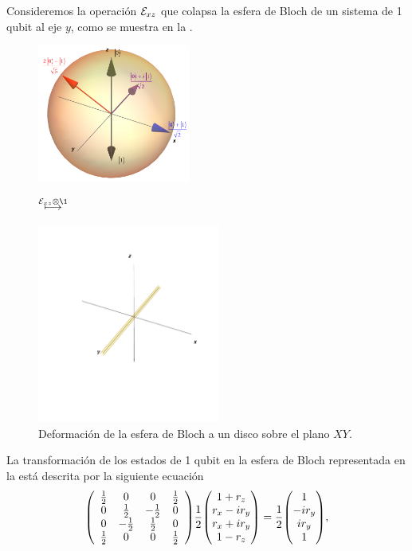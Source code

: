 Consideremos la operación $\mathcal{E}_{xz}$ que colapsa la esfera de Bloch de 
un sistema de 1 qubit al eje $y$, como se muestra en la .
\begin{figure}[H]
    \centering
    \begin{minipage}{.4\textwidth}
        \centering
        \includegraphics[width=5cm]
        {img-congreso/bloch.png}
    \end{minipage}
    $\stackrel{\E_{xz}\otimes\1 \vspace{1cm}}{\longmapsto}$
    \begin{minipage}{0.4\textwidth}
        \centering
        \includegraphics[width=6cm]
        {img-congreso/lineY}
    \end{minipage}
    \caption{Deformación de la esfera de Bloch a un disco sobre el plano $XY$.}
    \label{fig:QC-ex2}
\end{figure}
La transformación de los estados de 1 qubit en la esfera de Bloch 
representada en la  está descrita por la siguiente ecuación
\begin{align}
\mqty(
\begin{array}{cccc}
\frac{1}{2} & 0 & 0 & \frac{1}{2} \\
0 & \frac{1}{2} & -\frac{1}{2} & 0 \\
0 & -\frac{1}{2} & \frac{1}{2} & 0 \\
\frac{1}{2} & 0 & 0 & \frac{1}{2} \\
\end{array}
)
\frac{1}{2}
\mqty(
1+r_z\\r_x-ir_y\\r_x+ir_y\\1-r_z
)
=
\frac{1}{2}
\mqty(
1\\-ir_y\\ir_y\\1
),
\label{eq:QC-ex2-SR}
\end{align}
